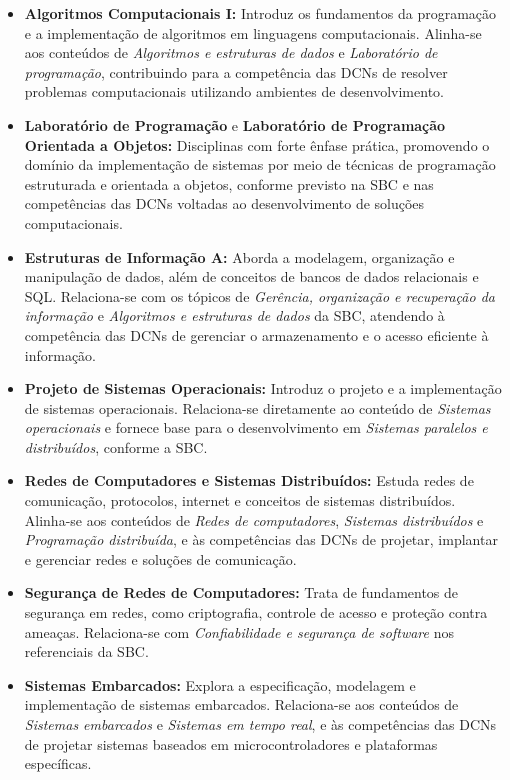 \begin{itemize}
  \item \textbf{Algoritmos Computacionais I:} Introduz os fundamentos da programação e a implementação de algoritmos em linguagens computacionais. Alinha-se aos conteúdos de \textit{Algoritmos e estruturas de dados} e \textit{Laboratório de programação}, contribuindo para a competência das DCNs de resolver problemas computacionais utilizando ambientes de desenvolvimento.

  \item \textbf{Laboratório de Programação} e \textbf{Laboratório de Programação Orientada a Objetos:} Disciplinas com forte ênfase prática, promovendo o domínio da implementação de sistemas por meio de técnicas de programação estruturada e orientada a objetos, conforme previsto na SBC e nas competências das DCNs voltadas ao desenvolvimento de soluções computacionais.

  \item \textbf{Estruturas de Informação A:} Aborda a modelagem, organização e manipulação de dados, além de conceitos de bancos de dados relacionais e SQL. Relaciona-se com os tópicos de \textit{Gerência, organização e recuperação da informação} e \textit{Algoritmos e estruturas de dados} da SBC, atendendo à competência das DCNs de gerenciar o armazenamento e o acesso eficiente à informação.

  \item \textbf{Projeto de Sistemas Operacionais:} Introduz o projeto e a implementação de sistemas operacionais. Relaciona-se diretamente ao conteúdo de \textit{Sistemas operacionais} e fornece base para o desenvolvimento em \textit{Sistemas paralelos e distribuídos}, conforme a SBC.

  \item \textbf{Redes de Computadores e Sistemas Distribuídos:} Estuda redes de comunicação, protocolos, internet e conceitos de sistemas distribuídos. Alinha-se aos conteúdos de \textit{Redes de computadores}, \textit{Sistemas distribuídos} e \textit{Programação distribuída}, e às competências das DCNs de projetar, implantar e gerenciar redes e soluções de comunicação.

  \item \textbf{Segurança de Redes de Computadores:} Trata de fundamentos de segurança em redes, como criptografia, controle de acesso e proteção contra ameaças. Relaciona-se com \textit{Confiabilidade e segurança de software} nos referenciais da SBC.

  \item \textbf{Sistemas Embarcados:} Explora a especificação, modelagem e implementação de sistemas embarcados. Relaciona-se aos conteúdos de \textit{Sistemas embarcados} e \textit{Sistemas em tempo real}, e às competências das DCNs de projetar sistemas baseados em microcontroladores e plataformas específicas.


\end{itemize}

